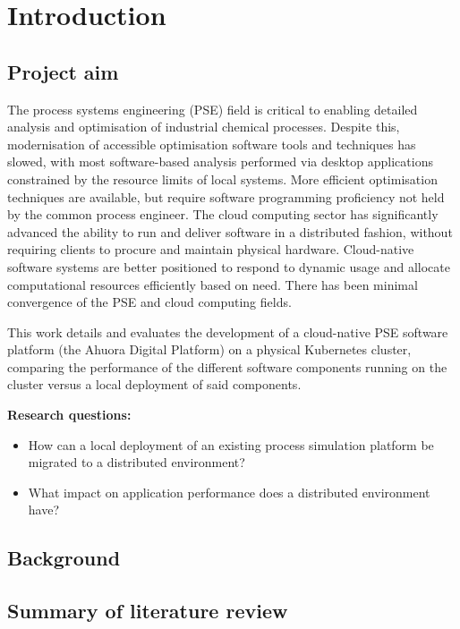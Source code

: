 \chapter{Introduction}
\label{sec:intro}

\section{Project aim}

The process systems engineering (PSE) field is critical to enabling detailed analysis and optimisation of industrial chemical processes. Despite this, modernisation of accessible optimisation software tools and techniques has slowed, with most software-based analysis performed via desktop applications constrained by the resource limits of local systems. More efficient optimisation techniques are available, but require software programming proficiency not held by the common process engineer. The cloud computing sector has significantly advanced the ability to run and deliver software in a distributed fashion, without requiring clients to procure and maintain physical hardware. Cloud-native software systems are better positioned to respond to dynamic usage and allocate computational resources efficiently based on need. There has been minimal convergence of the PSE and cloud computing fields.

This work details and evaluates the development of a cloud-native PSE software platform (the Ahuora Digital Platform) on a physical Kubernetes cluster, comparing the performance of the different software components running on the cluster versus a local deployment of said components.


\noindent\textbf{Research questions:}
\begin{itemize}[itemsep=0pt]
    \item How can a local deployment of an existing process simulation platform be migrated to a distributed environment?
    \item What impact on application performance does a distributed environment have?
\end{itemize}

\section{Background}

\section{Summary of literature review}